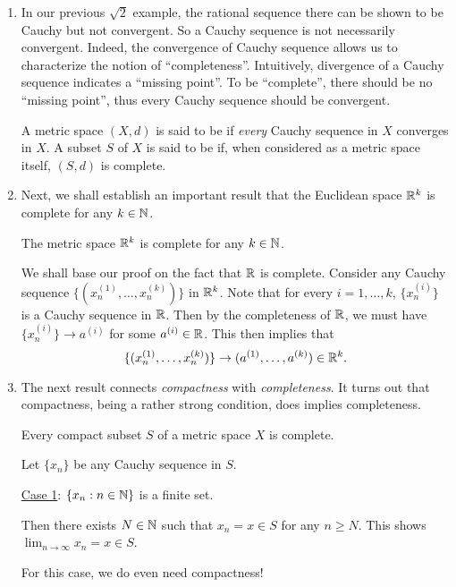 \begin{enumerate}
\item In our previous \(\sqrt{2}\) example, the rational sequence there can be
shown to be Cauchy but not convergent. So a Cauchy sequence is not necessarily
convergent. Indeed, the convergence of Cauchy sequence allows us to
characterize the notion of ``completeness''. Intuitively, divergence of a
Cauchy sequence indicates a ``missing point''. To be ``complete'', there should
be no ``missing point'', thus every Cauchy sequence should be convergent.

A metric space \((X,d)\) is said to be  if \emph{every} Cauchy
sequence in \(X\) converges in \(X\). A subset \(S\) of \(X\) is said to be
 if, when considered as a metric space itself, \((S,d)\) is
complete.

\item Next, we shall establish an important result that the Euclidean space
\(\mathbb{R}^k\) is complete for any \(k\in\mathbb{N}\).

\begin{theorem}
\label{thm:rk-complete}
The metric space \(\mathbb{R}^k\) is complete for any \(k\in\mathbb{N}\).
\end{theorem}
\begin{pf}
We shall base our proof on the fact that \(\mathbb{R}\) is complete. Consider any
Cauchy sequence \(\{(x_n^{(1)},\dotsc,x_n^{(k)})\}\) in \(\mathbb{R}^k\). Note that for
every \(i=1,\dotsc,k\), \(\{x_n^{(i)}\}\) is a Cauchy sequence in \(\mathbb{R}\). Then
by the completeness of \(\mathbb{R}\), we must have \(\{x_n^{(i)}\}\to a^{(i)}\) for
some \(a^{(i)}\in\mathbb{R}\). This then implies that
\[
\{(x_n^{(1)},\dotsc,x_n^{(k)})\}\to (a^{(1)},\dotsc,a^{(k)})\in\mathbb{R}^k.
\]
\end{pf}

\item The next result connects \emph{compactness} with \emph{completeness}. It
turns out that compactness, being a rather strong condition, does implies
completeness.

\begin{theorem}
\label{thm:cpt-subset-comp}
Every compact subset \(S\) of a metric space \(X\) is complete.
\end{theorem}
\begin{pf}
Let \(\{x_n\}\) be any Cauchy sequence in \(S\).

\underline{Case 1}: \(\{x_n:n\in\mathbb{N}\}\) is a finite set.

Then there exists \(N\in\mathbb{N}\) such that \(x_n=x\in S\) for any \(n\ge N\). This
shows \(\lim_{n\to \infty}x_n=x\in S\).
\begin{note}
For this case, we do even need compactness!
\end{note}


\end{pf}
\end{enumerate}

